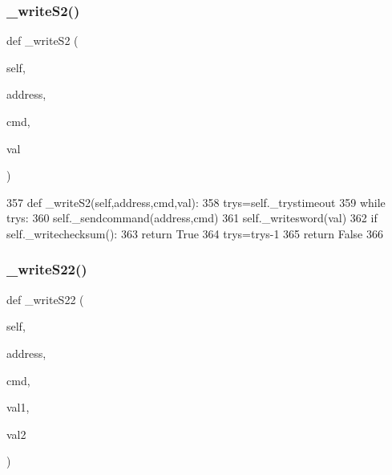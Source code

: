 \subsubsection{\texorpdfstring{\+\_\+write\+S2()}{\_writeS2()}}
{\footnotesize\ttfamily def \+\_\+write\+S2 (\begin{DoxyParamCaption}\item[{}]{self,  }\item[{}]{address,  }\item[{}]{cmd,  }\item[{}]{val }\end{DoxyParamCaption})\hspace{0.3cm}{\ttfamily [private]}}


\begin{DoxyCode}
357     \textcolor{keyword}{def }\_writeS2(self,address,cmd,val):
358         trys=self.\_trystimeout
359         \textcolor{keywordflow}{while} trys:
360             self.\_sendcommand(address,cmd)
361             self.\_writesword(val)
362             \textcolor{keywordflow}{if} self.\_writechecksum():
363                 \textcolor{keywordflow}{return} \textcolor{keyword}{True}
364             trys=trys-1
365         \textcolor{keywordflow}{return} \textcolor{keyword}{False}
366 
\end{DoxyCode}
\mbox{\label{classtoxic__hardware_1_1roboclaw__3_1_1Roboclaw_afb7691607c5a92004503e91af4ed905b}} 
\subsubsection{\texorpdfstring{\+\_\+write\+S22()}{\_writeS22()}}
{\footnotesize\ttfamily def \+\_\+write\+S22 (\begin{DoxyParamCaption}\item[{}]{self,  }\item[{}]{address,  }\item[{}]{cmd,  }\item[{}]{val1,  }\item[{}]{val2 }\end{DoxyParamCaption})\hspace{0.3cm}{\ttfamily [private]}}


